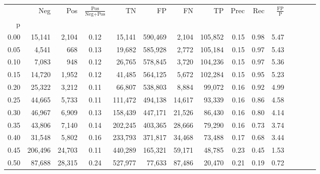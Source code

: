 \begin{tabular}{rrrcrrrrrrrrrrr}
\toprule
{} &      Neg &     Pos & $\frac{\text{Pos}}{\text{Neg}+\text{Pos}}$ &       TN &       FP &       FN &       TP &  Prec &   Rec & $\frac{\text{FP}}{\text{P}}$ \\
p    &          &         &                                            &          &          &          &          &       &       &                              \\
\midrule
0.00 &   15,141 &   2,104 &                                       0.12 &   15,141 &  590,469 &    2,104 &  105,852 &  0.15 &  0.98 &                         5.47 \\
0.05 &    4,541 &     668 &                                       0.13 &   19,682 &  585,928 &    2,772 &  105,184 &  0.15 &  0.97 &                         5.43 \\
0.10 &    7,083 &     948 &                                       0.12 &   26,765 &  578,845 &    3,720 &  104,236 &  0.15 &  0.97 &                         5.36 \\
0.15 &   14,720 &   1,952 &                                       0.12 &   41,485 &  564,125 &    5,672 &  102,284 &  0.15 &  0.95 &                         5.23 \\
0.20 &   25,322 &   3,212 &                                       0.11 &   66,807 &  538,803 &    8,884 &   99,072 &  0.16 &  0.92 &                         4.99 \\
0.25 &   44,665 &   5,733 &                                       0.11 &  111,472 &  494,138 &   14,617 &   93,339 &  0.16 &  0.86 &                         4.58 \\
0.30 &   46,967 &   6,909 &                                       0.13 &  158,439 &  447,171 &   21,526 &   86,430 &  0.16 &  0.80 &                         4.14 \\
0.35 &   43,806 &   7,140 &                                       0.14 &  202,245 &  403,365 &   28,666 &   79,290 &  0.16 &  0.73 &                         3.74 \\
0.40 &   31,548 &   5,802 &                                       0.16 &  233,793 &  371,817 &   34,468 &   73,488 &  0.17 &  0.68 &                         3.44 \\
0.45 &  206,496 &  24,703 &                                       0.11 &  440,289 &  165,321 &   59,171 &   48,785 &  0.23 &  0.45 &                         1.53 \\
0.50 &   87,688 &  28,315 &                                       0.24 &  527,977 &   77,633 &   87,486 &   20,470 &  0.21 &  0.19 &                         0.72 \\

\end{tabular}
